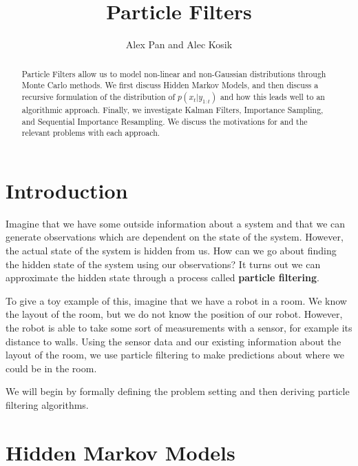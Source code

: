 \documentclass{article}
\title{\vspace{-2cm}Particle Filters} %
\author{Alex Pan and Alec Kosik}
\date{} %
\begin{document}
\maketitle

\begin{abstract}
Particle Filters allow us to model non-linear and non-Gaussian distributions through Monte Carlo methods. We first discuss Hidden Markov Models, and then discuss a recursive formulation of the distribution of $p(x_t|y_{1:t})$ and how this leads well to an algorithmic approach. Finally, we investigate Kalman Filters, Importance Sampling, and Sequential Importance Resampling. We discuss the motivations for and the relevant problems with each approach.
\end{abstract}

\section{Introduction}

Imagine that we have some outside information about a system and that we can generate observations which are dependent on the state of the system. However, the actual state of the system is hidden from us. How can we go about finding the hidden state of the system using our observations? It turns out we can approximate the hidden state through a process called \textbf{particle filtering}.

To give a toy example of this, imagine that we have a robot in a room. We know the layout of the room, but we do not know the position of our robot. However, the robot is able to take some sort of measurements with a sensor, for example its distance to walls. Using the sensor data and our existing information about the layout of the room, we use particle filtering to make predictions about where we could be in the room.

We will begin by formally defining the problem setting and then deriving particle filtering algorithms.

\section{Hidden Markov Models}
\end{document}
